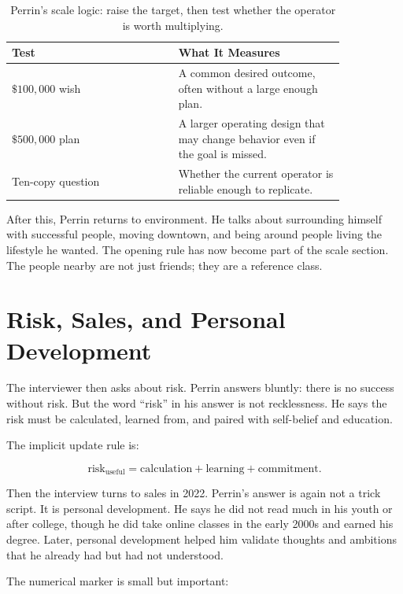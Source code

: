 \begin{table}
\centering
\begin{tabular}{|p{0.42\linewidth}|p{0.42\linewidth}|}
\hline
\textbf{Test} & \textbf{What It Measures} \\
\hline
\(\$100{,}000\) wish & A common desired outcome, often without a large enough plan. \\
\hline
\(\$500{,}000\) plan & A larger operating design that may change behavior even if the goal is missed. \\
\hline
Ten-copy question & Whether the current operator is reliable enough to replicate. \\
\hline
\end{tabular}
\caption{Perrin's scale logic: raise the target, then test whether the operator is worth multiplying.}
\end{table}

After this, Perrin returns to environment. He talks about surrounding himself with successful people, moving downtown, and being around people living the lifestyle he wanted. The opening rule has now become part of the scale section. The people nearby are not just friends; they are a reference class.

\section{Risk, Sales, and Personal Development}

The interviewer then asks about risk. Perrin answers bluntly: there is no success without risk. But the word ``risk'' in his answer is not recklessness. He says the risk must be calculated, learned from, and paired with self-belief and education.

The implicit update rule is:

\begin{equation}
\mathrm{risk}_{\mathrm{useful}}
=
\mathrm{calculation}
+
\mathrm{learning}
+
\mathrm{commitment}.
\end{equation}

Then the interview turns to sales in 2022. Perrin's answer is again not a trick script. It is personal development. He says he did not read much in his youth or after college, though he did take online classes in the early 2000s and earned his degree. Later, personal development helped him validate thoughts and ambitions that he already had but had not understood.

The numerical marker is small but important:

